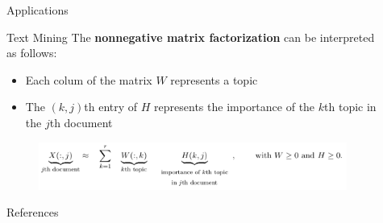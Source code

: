 \documentclass[final]{beamer}
\newlength{\sepwid}
\newlength{\onecolwid}
\newlength{\threecolwid}
\begin{document}
\begin{frame}
\begin{columns}[t]
\begin{column}{\threecolwid}
\begin{exampleblock}{Applications}
\begin{block}{Text Mining}
The \textbf{nonnegative matrix factorization} can be interpreted as follows:\\
\begin{itemize}
    \item Each colum of the matrix $W$ represents a topic
    \item The $(k,j)$th entry of $H$ represents the importance of the $k$th topic in the $j$th document
\end{itemize}
\begin{figure}
    \centering
    \includegraphics{../images/NMF_app2.png}
\end{figure}
\end{block}
\end{exampleblock}
\begin{exampleblock}{References}
\nocite{biclique}
\nocite{NMF}
\printbibliography
\end{exampleblock}
\end{column}
\begin{column}{\sepwid}
\end{column} %
\begin{column}{\onecolwid} %



\end{column}
\end{columns}
\end{frame}
\end{document}

